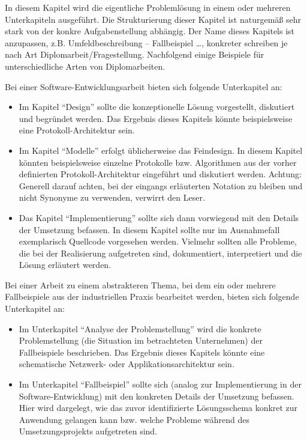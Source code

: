 In diesem Kapitel wird die eigentliche Problemlösung in einem oder mehreren Unterkapiteln ausgeführt. Die Strukturierung dieser Kapitel ist naturgemäß sehr stark von der konkre Aufgabenstellung abhängig. Der Name dieses Kapitels ist anzupassen, z.B. Umfeldbeschreibung -- Fallbeispiel \dots, konkreter schreiben je nach Art Diplomarbeit/Fragestellung.
\makeatletter\ifthesis@masterthesis
Nachfolgend einige Beispiele für unterschiedliche Arten von Diplomarbeiten.

Bei einer Software-Entwicklungsarbeit bieten sich folgende Unterkapitel an:
\begin{itemize}
	\item Im Kapitel \enquote{Design} sollte die konzeptionelle Lösung vorgestellt, diskutiert und begründet werden. Das Ergebnis dieses Kapitels könnte beispielsweise eine Protokoll-Architektur sein.
	\item Im Kapitel \enquote{Modelle} erfolgt üblicherweise das Feindesign. In diesem Kapitel könnten beispielsweise einzelne Protokolle bzw. Algorithmen aus der vorher definierten Protokoll-Architektur eingeführt und diskutiert werden. Achtung: Generell darauf achten, bei der eingangs erläuterten Notation zu bleiben und nicht Synonyme zu verwenden, verwirrt den Leser.
	\item Das Kapitel \enquote{Implementierung} sollte sich dann vorwiegend mit den Details der Umsetzung befassen. In diesem Kapitel sollte nur im Ausnahmefall exemplarisch Quellcode vorgesehen werden. Vielmehr sollten alle Probleme, die bei der Realisierung aufgetreten sind, dokumentiert, interpretiert und die Lösung erläutert werden.
\end{itemize}

Bei einer Arbeit zu einem abstrakteren Thema, bei dem ein oder mehrere Fallbeispiele aus der industriellen Praxis bearbeitet werden, bieten sich folgende Unterkapitel an:
\begin{itemize}
	\item Im Unterkapitel \enquote{Analyse der Problemstellung} wird die konkrete Problemstellung (die Situation im betrachteten Unternehmen) der Fallbeispiele beschrieben. Das Ergebnis dieses Kapitels könnte eine schematische Netzwerk- oder Applikationsarchitektur sein.
	\item Im Unterkapitel \enquote{Fallbeispiel} sollte sich (analog zur Implementierung in der Software-Entwicklung) mit den konkreten Details der Umsetzung befassen. Hier wird dargelegt, wie das zuvor identifizierte Lösungsschema konkret zur Anwendung gelangen kann bzw. welche Probleme während des Umsetzungsprojekts aufgetreten sind.
\end{itemize}

